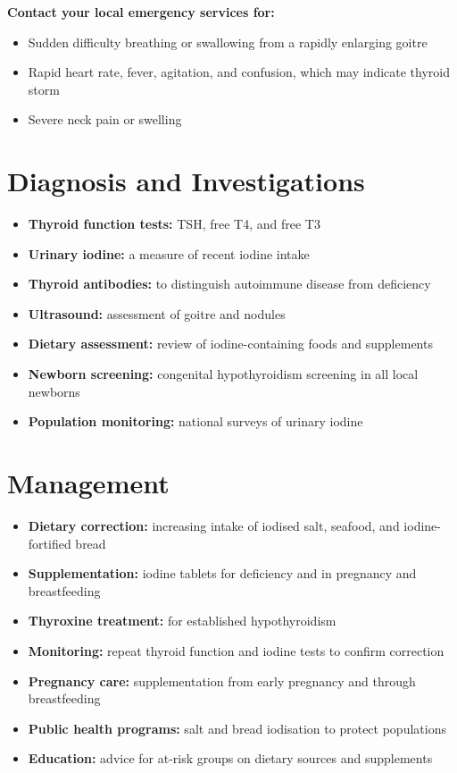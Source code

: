 \textbf{Contact your local emergency services for:}
\begin{itemize}
    \item Sudden difficulty breathing or swallowing from a rapidly enlarging goitre
    \item Rapid heart rate, fever, agitation, and confusion, which may indicate thyroid storm
    \item Severe neck pain or swelling
\end{itemize}

\section*{Diagnosis and Investigations}
\begin{itemize}
    \item \textbf{Thyroid function tests:} TSH, free T4, and free T3
    \item \textbf{Urinary iodine:} a measure of recent iodine intake
    \item \textbf{Thyroid antibodies:} to distinguish autoimmune disease from deficiency
    \item \textbf{Ultrasound:} assessment of goitre and nodules
    \item \textbf{Dietary assessment:} review of iodine-containing foods and supplements
    \item \textbf{Newborn screening:} congenital hypothyroidism screening in all local newborns
    \item \textbf{Population monitoring:} national surveys of urinary iodine
\end{itemize}

\section*{Management}
\begin{itemize}
    \item \textbf{Dietary correction:} increasing intake of iodised salt, seafood, and iodine-fortified bread
    \item \textbf{Supplementation:} iodine tablets for deficiency and in pregnancy and breastfeeding
    \item \textbf{Thyroxine treatment:} for established hypothyroidism
    \item \textbf{Monitoring:} repeat thyroid function and iodine tests to confirm correction
    \item \textbf{Pregnancy care:} supplementation from early pregnancy and through breastfeeding
    \item \textbf{Public health programs:} salt and bread iodisation to protect populations
    \item \textbf{Education:} advice for at-risk groups on dietary sources and supplements
\end{itemize}

